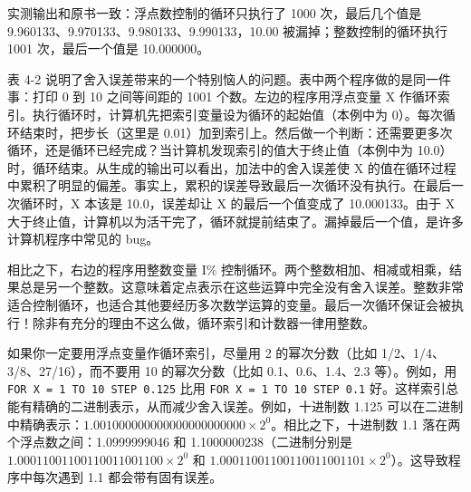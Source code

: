 \begin{Shaded}
\begin{Highlighting}[]
\OperatorTok{(}\OperatorTok{);}
     \OperatorTok{(}\OperatorTok{=} \OperatorTok{;}\OperatorTok{\textless{}=} \OperatorTok{;}\OperatorTok{++)} \OperatorTok{\{}
        \OperatorTok{=}\OperatorTok{/} \OperatorTok{;}
\OperatorTok{(}\OperatorTok{,}\OperatorTok{,} \OperatorTok{);}
    \OperatorTok{\}}
     \OperatorTok{;}
\OperatorTok{\}}
\end{Highlighting}
\end{Shaded}

实测输出和原书一致：浮点数控制的循环只执行了 1000 次，最后几个值是
9.960133、9.970133、9.980133、9.990133，10.00 被漏掉；整数控制的循环执行
1001 次，最后一个值是 10.000000。

表 4-2
说明了舍入误差带来的一个特别恼人的问题。表中两个程序做的是同一件事：打印
0 到 10 之间等间距的 1001 个数。左边的程序用浮点变量 X
作循环索引。执行循环时，计算机先把索引变量设为循环的起始值（本例中为
0）。每次循环结束时，把步长（这里是
0.01）加到索引上。然后做一个判断：还需要更多次循环，还是循环已经完成？当计算机发现索引的值大于终止值（本例中为
10.0）时，循环结束。从生成的输出可以看出，加法中的舍入误差使 X
的值在循环过程中累积了明显的偏差。事实上，累积的误差导致最后一次循环没有执行。在最后一次循环时，X
本该是 10.0，误差却让 X 的最后一个值变成了 10.000133。由于 X
大于终止值，计算机以为活干完了，循环就提前结束了。漏掉最后一个值，是许多计算机程序中常见的
bug。

相比之下，右边的程序用整数变量 I\%
控制循环。两个整数相加、相减或相乘，结果总是另一个整数。这意味着定点表示在这些运算中完全没有舍入误差。整数非常适合控制循环，也适合其他要经历多次数学运算的变量。最后一次循环保证会被执行！除非有充分的理由不这么做，循环索引和计数器一律用整数。

如果你一定要用浮点变量作循环索引，尽量用 2 的幂次分数（比如
1/2、1/4、3/8、27/16），而不要用 10 的幂次分数（比如 0.1、0.6、1.4、2.3
等）。例如，用 \texttt{FOR\ X\ =\ 1\ TO\ 10\ STEP\ 0.125} 比用
\texttt{FOR\ X\ =\ 1\ TO\ 10\ STEP\ 0.1}
好。这样索引总能有精确的二进制表示，从而减少舍入误差。例如，十进制数
1.125
可以在二进制中精确表示：\(1.001000000000000000000000 \times 2^0\)。相比之下，十进制数
1.1 落在两个浮点数之间：1.0999999046 和 1.1000000238（二进制分别是
\(1.00011001100110011001100 \times 2^0\) 和
\(1.00011001100110011001101 \times 2^0\)）。这导致程序中每次遇到 1.1
都会带有固有误差。

